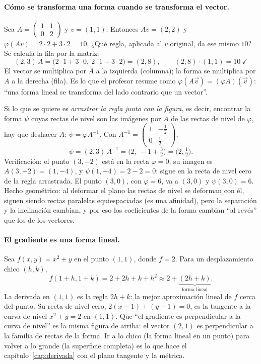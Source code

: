 \paragraph{Cómo se transforma una forma cuando se transforma el vector.} Sea
\(A=\begin{pmatrix}1&1\\0&2\end{pmatrix}\) y \(v=(1,1)\). Entonces \(Av=(2,2)\) y
\(\varphi(Av)=2\cdot2+3\cdot2=10\). ¿Qué regla, aplicada al \(v\) original, da ese mismo
\(10\)? Se calcula la fila por la matriz:
\[
  (2,3)\,A=\bigl(2\cdot1+3\cdot0,\ 2\cdot1+3\cdot2\bigr)=(2,8),
  \qquad (2,8)\cdot(1,1)=10\ \checkmark
\]
El vector se multiplica por \(A\) a la izquierda (columna); la forma se multiplica por
\(A\) a la derecha (fila). Es lo que el profesor resume como \(\varphi(A\vec v)=(\varphi A)(\vec v)\):
``una forma lineal se transforma del lado contrario que un vector''.

Si lo que se quiere es \emph{arrastrar la regla junto con la figura}, es decir, encontrar
la forma \(\psi\) cuyas rectas de nivel son las imágenes por \(A\) de las rectas de nivel
de \(\varphi\), hay que deshacer \(A\): \(\psi=\varphi A^{-1}\). Con
\(A^{-1}=\begin{pmatrix}1&-\tfrac12\\0&\tfrac12\end{pmatrix}\),
\[
  \psi=(2,3)\,A^{-1}=\bigl(2,\ -1+\tfrac32\bigr)=\bigl(2,\tfrac12\bigr).
\]
Verificación: el punto \((3,-2)\) está en la recta \(\varphi=0\); su imagen es
\(A(3,-2)=(1,-4)\), y \(\psi(1,-4)=2-2=0\): sigue en la recta de nivel cero de la regla
arrastrada. El punto \((3,0)\), con \(\varphi=6\), va a \((3,0)\) y \(\psi(3,0)=6\).
Hecho geométrico: al deformar el plano las rectas de nivel se deforman con él, siguen
siendo rectas paralelas equiespaciadas (es una afinidad), pero la separación y la
inclinación cambian, y por eso los coeficientes de la forma cambian ``al revés'' que los
de los vectores.

\paragraph{El gradiente es una forma lineal.} Sea \(f(x,y)=x^2+y\) en el punto \((1,1)\),
donde \(f=2\). Para un desplazamiento chico \((h,k)\),
\[
  f(1+h,1+k)=2+2h+k+h^2\approx 2+\underbrace{(2h+k)}_{\text{forma lineal}} .
\]
La derivada en \((1,1)\) es la regla \(2h+k\): la mejor aproximación lineal de \(f\) cerca
del punto. Su recta de nivel cero, \(2(x-1)+(y-1)=0\), es la tangente a la curva de nivel
\(x^2+y=2\) en \((1,1)\). Que ``el gradiente es perpendicular a la curva de nivel'' es la
misma figura de arriba: el vector \((2,1)\) es perpendicular a la familia de rectas de la
forma. Ir a lo chico (la forma lineal en un punto) para volver a lo grande (la superficie
completa) es lo que hace el capítulo~\ref{cap:derivada} con el plano tangente y la métrica.

